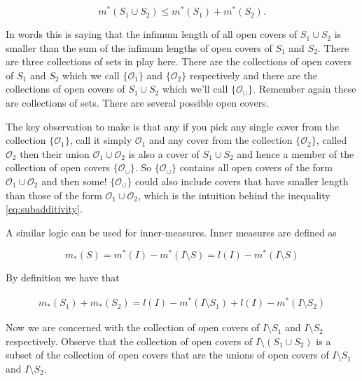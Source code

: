 \documentclass[oneside]{book}
\begin{document}
\begin{equation}
\label{eq:subadditivity}
m^*(S_1 \cup S_2) \le m^*(S_1) + m^*(S_2).
\end{equation}

In words this is saying that the infimum length of all open covers of $S_1 \cup S_2$ is smaller than the sum of the infimum lengths of open covers of $S_1$ and $S_2$. There are three collections of sets in play here. There are the collections of open covers of $S_1$ and $S_2$ which we call $\{\mathcal{O}_1\}$ and $\{\mathcal{O}_2\}$ respectively and there are the collections of open covers of $S_1 \cup S_2$ which we'll call $\{\mathcal{O}_\cup\}$. Remember again these are collections of sets. There are several possible open covers. 

The key observation to make is that any if you pick any single cover from the collection $\{\mathcal{O}_1\}$, call it simply $\mathcal{O}_1$ and any cover from the collection $\{\mathcal{O}_2\}$, called $\mathcal{O}_2$ then their union $\mathcal{O}_1 \cup \mathcal{O}_2$ is also a cover of $S_1 \cup S_2$ and hence a member of the collection of open covers $\{\mathcal{O}_\cup\}$. So $\{\mathcal{O}_\cup\}$ contains all open covers of the form $\mathcal{O}_1 \cup \mathcal{O}_2$ and then some! $\{\mathcal{O}_\cup\}$ could also include covers that have smaller length than those of the form $\mathcal{O}_1 \cup \mathcal{O}_2$, which is the intuition behind the inequality \ref{eq:subadditivity}.

A similar logic can be used for inner-measures. Inner measures are defined as 

\begin{equation}
\label{eq:innerMeasure}
m_*(S) = m^*(I) - m^*(I \setminus S) = l(I) - m^*(I \setminus S)
\end{equation}

By definition we have that

\begin{eqnarray}
m_*(S_1) + m_*(S_2) = l(I)-m^*(I \setminus S_1) + l(I)-m^*(I \setminus S_2)
\end{eqnarray}

Now we are concerned with the collection of open covers of $I \setminus S_1$ and $I \setminus S_2$ respectively. Observe that the collection of open covers of $I \setminus (S_1 \cup S_2)$ is a subset of the collection of open covers that are the unions of open covers of $I \setminus S_1$ and $I \setminus S_2$.
\end{document}
